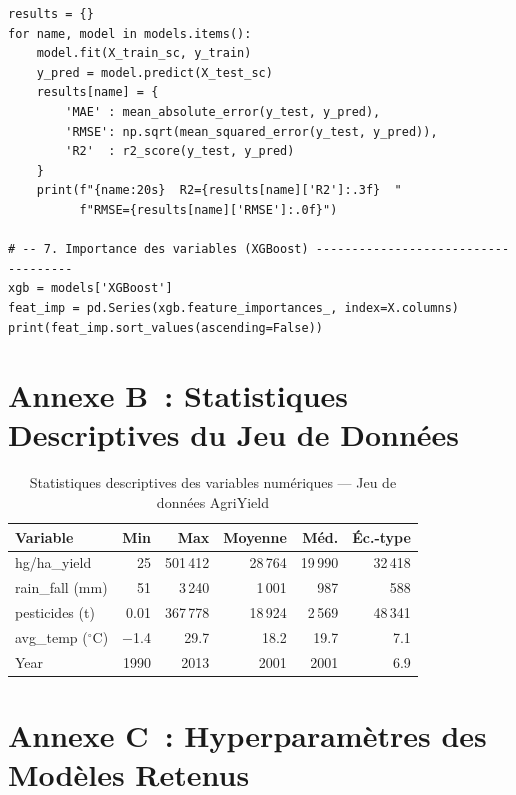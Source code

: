 \begin{small}
\begin{verbatim}
results = {}
for name, model in models.items():
    model.fit(X_train_sc, y_train)
    y_pred = model.predict(X_test_sc)
    results[name] = {
        'MAE' : mean_absolute_error(y_test, y_pred),
        'RMSE': np.sqrt(mean_squared_error(y_test, y_pred)),
        'R2'  : r2_score(y_test, y_pred)
    }
    print(f"{name:20s}  R2={results[name]['R2']:.3f}  "
          f"RMSE={results[name]['RMSE']:.0f}")

# -- 7. Importance des variables (XGBoost) ------------------------------------
xgb = models['XGBoost']
feat_imp = pd.Series(xgb.feature_importances_, index=X.columns)
print(feat_imp.sort_values(ascending=False))
\end{verbatim}
\end{small}

\section*{Annexe B~: Statistiques Descriptives du Jeu de Données}

\begin{table}[H]
\centering
\caption{Statistiques descriptives des variables numériques --- Jeu de données AgriYield}
\label{tab:stats-desc}
\renewcommand{\arraystretch}{1.4}
\begin{tabular}{|l|r|r|r|r|r|}
\hline
\rowcolor{maingreen!15}\textbf{Variable} & \textbf{Min} & \textbf{Max} & \textbf{Moyenne} & \textbf{Méd.} & \textbf{Éc.-type} \\
\hline
hg/ha\_yield & 25 & 501\,412 & 28\,764 & 19\,990 & 32\,418 \\
\hline
rain\_fall (mm) & 51 & 3\,240 & 1\,001 & 987 & 588 \\
\hline
pesticides (t) & 0.01 & 367\,778 & 18\,924 & 2\,569 & 48\,341 \\
\hline
avg\_temp ($^\circ$C) & $-$1.4 & 29.7 & 18.2 & 19.7 & 7.1 \\
\hline
Year & 1990 & 2013 & 2001 & 2001 & 6.9 \\
\hline
\end{tabular}
\end{table}

\section*{Annexe C~: Hyperparamètres des Modèles Retenus}

